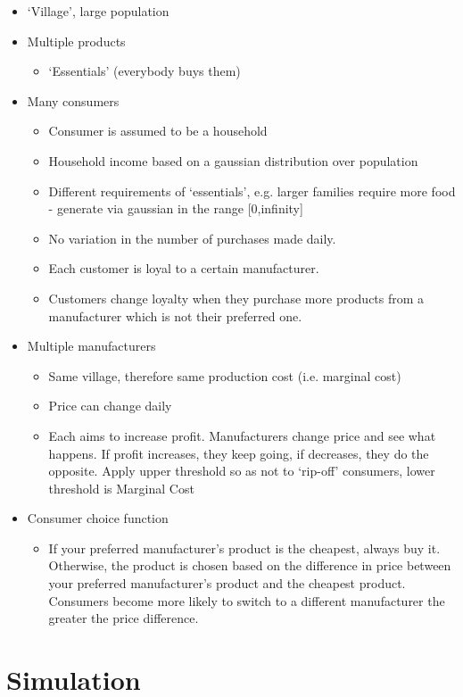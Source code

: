 \documentclass[11pt]{article}
\begin{document}
\begin{itemize}
\item `Village', large population
\item Multiple products
\begin{itemize}
\item `Essentials' (everybody buys them)
\end{itemize}
\item Many consumers
\begin{itemize}
\item Consumer is assumed to be a household
\item Household income based on a gaussian distribution over population
\item Different requirements of `essentials', e.g. larger families require more food - generate via gaussian in the range [0,infinity]
\item No variation in the number of purchases made daily.
\item Each customer is loyal to a certain manufacturer.
\item Customers change loyalty when they purchase more products from a manufacturer which is not their preferred one.
\end{itemize}
\item Multiple manufacturers
\begin{itemize}
\item Same village, therefore same production cost (i.e. marginal cost)
\item Price can change daily
\item Each aims to increase profit. Manufacturers change price and see what happens. If profit increases, they keep going, if decreases, they do the opposite. Apply upper threshold so as not to `rip-off' consumers, lower threshold is Marginal Cost
\end{itemize}
\item Consumer choice function
\begin{itemize}
\item If your preferred manufacturer's product is the cheapest, always buy it. Otherwise, the product is chosen based on the difference in price between your preferred manufacturer's product and the cheapest product. Consumers become more likely to switch to a different manufacturer the greater the price difference.
\end{itemize}
\end{itemize}
\section{Simulation}
\label{sec-3}
\end{document}
